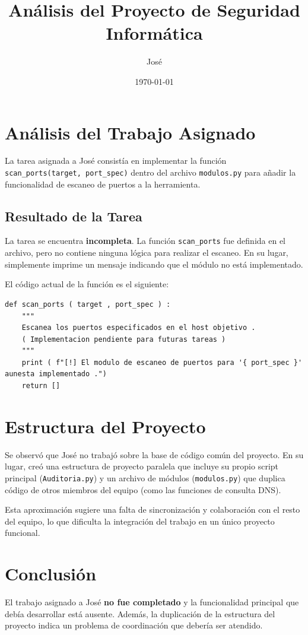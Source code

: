 \documentclass{article}
\title{Análisis del Proyecto de Seguridad Informática}
\author{José}
\date{\today}
\begin{document}
\maketitle

\section{Análisis del Trabajo Asignado}
La tarea asignada a José consistía en implementar la función \texttt{scan\_ports(target, port\_spec)} dentro del archivo \texttt{modulos.py} para añadir la funcionalidad de escaneo de puertos a la herramienta.

\subsection{Resultado de la Tarea}
La tarea se encuentra \textbf{incompleta}. La función \texttt{scan\_ports} fue definida en el archivo, pero no contiene ninguna lógica para realizar el escaneo. En su lugar, simplemente imprime un mensaje indicando que el módulo no está implementado.

El código actual de la función es el siguiente:
\begin{verbatim}
def scan_ports ( target , port_spec ) :
    """
    Escanea los puertos especificados en el host objetivo .
    ( Implementacion pendiente para futuras tareas )
    """
    print ( f"[!] El modulo de escaneo de puertos para '{ port_spec }' aunesta implementado .")
    return []
\end{verbatim}

\section{Estructura del Proyecto}
Se observó que José no trabajó sobre la base de código común del proyecto. En su lugar, creó una estructura de proyecto paralela que incluye su propio script principal (\texttt{Auditoria.py}) y un archivo de módulos (\texttt{modulos.py}) que duplica código de otros miembros del equipo (como las funciones de consulta DNS).

Esta aproximación sugiere una falta de sincronización y colaboración con el resto del equipo, lo que dificulta la integración del trabajo en un único proyecto funcional.

\section{Conclusión}
El trabajo asignado a José \textbf{no fue completado} y la funcionalidad principal que debía desarrollar está ausente. Además, la duplicación de la estructura del proyecto indica un problema de coordinación que debería ser atendido.
\end{document}
